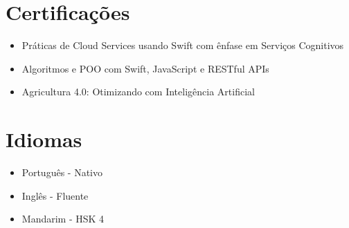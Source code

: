 \documentclass[a4paper,10pt]{article}
\begin{document}
\section*{ Certificações}
\begin{itemize}[label=]
    \item Práticas de Cloud Services usando Swift com ênfase em Serviços Cognitivos
    \item Algoritmos e POO com Swift, JavaScript e RESTful APIs
    \item Agricultura 4.0: Otimizando com Inteligência Artificial
\end{itemize}

\section*{ Idiomas}
\begin{itemize}[label=]
    \item Português - Nativo
    \item Inglês - Fluente
    \item Mandarim - HSK 4
\end{itemize}
\end{document}
